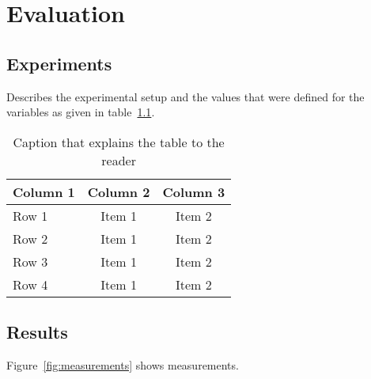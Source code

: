 \chapter{Evaluation}

\section{Experiments}

Describes the experimental setup and the values that were defined for the variables as given in table~\ref{tab:experimentsetup}.

\begin{table}[!h]
\begin{center}
	\begin{tabular}{|l|c|c|} 
	\hline
 	\bf Column 1  & \bf Column 2  & \bf Column 3 \\
  	\hline
	Row 1 & Item 1 & Item 2 \\
	Row 2 & Item 1 & Item 2 \\
	Row 3 & Item 1 & Item 2 \\
	Row 4 & Item 1 & Item 2 \\
	\hline
	\end{tabular}
\end{center}
\caption[Variables of the experiment]{Caption that explains the table to the reader}	
\label{tab:experimentsetup}
\end{table}

\section{Results}

Figure~\ref{fig:measurements} shows measurements.




